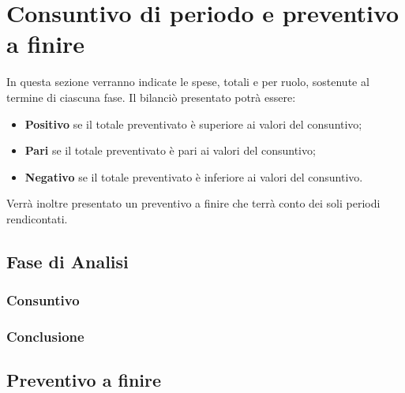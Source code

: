 \section{Consuntivo di periodo e preventivo a finire}
In questa sezione verranno indicate le spese, totali e per ruolo, sostenute al termine di ciascuna fase.
Il bilanciò presentato potrà essere:
\begin{itemize}
	\item \textbf{Positivo} se il totale preventivato è superiore ai valori del consuntivo;
	\item \textbf{Pari} se il totale preventivato è pari ai valori del consuntivo;
	\item \textbf{Negativo} se il totale preventivato è inferiore ai valori del consuntivo.
\end{itemize}
Verrà inoltre presentato un preventivo a finire che terrà conto dei soli periodi rendicontati.
\subsection{Fase di Analisi}
	\subsubsection{Consuntivo}
	\subsubsection{Conclusione}

\subsection{Preventivo a finire}